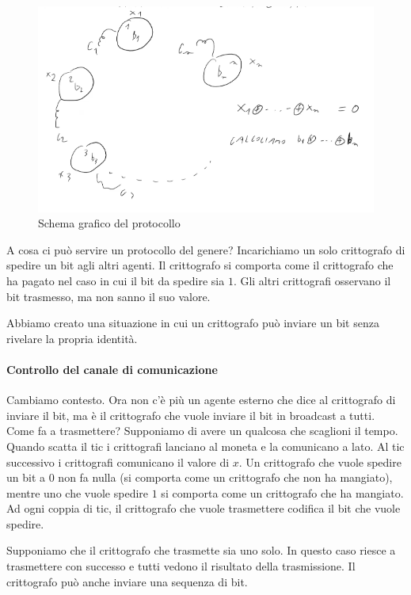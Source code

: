 \begin{figure}
    \centering
    \includegraphics[width=1\textwidth]{images/12-3-1.png}
    \caption{Schema grafico del protocollo}
    \label{fig:12-3-1}
\end{figure}

\noindent A cosa ci può servire un protocollo del genere? Incarichiamo un solo crittografo di spedire un bit agli altri agenti. Il crittografo si comporta come il crittografo che ha pagato nel caso in cui il bit da spedire sia $1$. Gli altri crittografi osservano il bit trasmesso, ma non sanno il suo valore. 

Abbiamo creato una situazione in cui un crittografo può inviare un bit senza rivelare la propria identità.\\

\paragraph{Controllo del canale di comunicazione} Cambiamo contesto. Ora non c'è più un agente esterno che dice al crittografo di inviare il bit, ma è il crittografo che vuole inviare il bit in broadcast a tutti. Come fa a trasmettere? Supponiamo di avere un qualcosa che scaglioni il tempo. Quando scatta il tic i crittografi lanciano al moneta e la comunicano a lato. Al tic successivo i crittografi comunicano il valore di $x$. Un crittografo che vuole spedire un bit a $0$ non fa nulla (si comporta come un crittografo che non ha mangiato), mentre uno che vuole spedire $1$ si comporta come un crittografo che ha mangiato. Ad ogni coppia di tic, il crittografo che vuole trasmettere codifica il bit che vuole spedire. 

Supponiamo che il crittografo che trasmette sia uno solo. In questo caso riesce a trasmettere con successo e tutti vedono il risultato della trasmissione. Il crittografo può anche inviare una sequenza di bit. 

